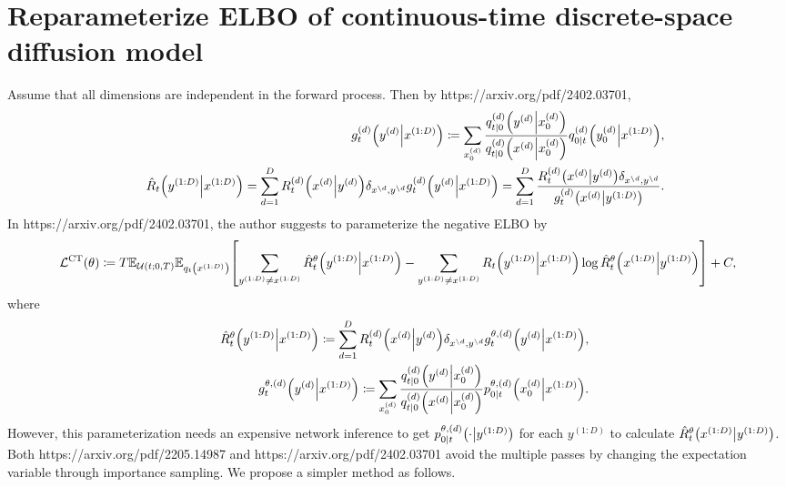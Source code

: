 \documentclass[10pt]{article}
\begin{document}
\section{Reparameterize ELBO of continuous-time discrete-space diffusion model}

Assume that all dimensions are independent in the forward process. Then by https://arxiv.org/pdf/2402.03701,
\begin{eqnarray}\label{EqDivParaHatR}
  &&g^{(d)}_t\qty(y^{(d)}\middle|x^{(1:D)})\coloneq\sum_{x^{(d)}_0}\frac{q^{(d)}_{t|0}\qty(y^{(d)}\middle|x^{(d)}_0)}{q^{(d)}_{t|0}\qty(x^{(d)}\middle|x^{(d)}_0)}q^{(d)}_{0|t}\qty(y^{(d)}_0\middle| x^{(1:D)}),\\
  &&\hat{R}_t\qty(y^{(1:D)}\middle|x^{(1:D)})=\sum_{d=1}^D R^{(d)}_t\qty(x^{(d)}\middle| y^{(d)})\delta_{x^{\setminus d},y^{\setminus d}} g^{(d)}_t\qty(y^{(d)}\middle|x^{(1:D)})=\sum_{d=1}^D \frac{R^{(d)}_t\qty(x^{(d)}\middle| y^{(d)})\delta_{x^{\setminus d},y^{\setminus d}}}{g^{(d)}_t\qty(x^{(d)}\middle|y^{(1:D)})}.
\end{eqnarray}
In https://arxiv.org/pdf/2402.03701, the author suggests to parameterize the negative ELBO by
\begin{eqnarray*}
  \mathcal{L}^\text{CT}(\theta)\coloneq T\mathbb{E}_{\mathcal{U}(t;0,T)}\mathbb{E}_{q_t\qty(x^{(1:D)})}\qty[\sum_{y^{(1:D)}\neq x^{(1:D)}}\hat{R}_t^\theta\qty(y^{(1:D)}\middle|x^{(1:D)}) - \sum_{y^{(1:D)}\neq x^{(1:D)}}R_t\qty(y^{(1:D)}\middle|x^{(1:D)})\log\hat{R}_t^\theta\qty(x^{(1:D)}\middle|y^{(1:D)})] + C,
\end{eqnarray*}
where
\begin{eqnarray*}
  &&\hat{R}^\theta_t\qty(y^{(1:D)}\middle|x^{(1:D)})\coloneqq\sum_{d=1}^D R^{(d)}_t\qty(x^{(d)}\middle| y^{(d)})\delta_{x^{\setminus d},y^{\setminus d}} g^{\theta,(d)}_t\qty(y^{(d)}\middle|x^{(1:D)}),\\
  &&g^{\theta,(d)}_t\qty(y^{(d)}\middle|x^{(1:D)})\coloneq\sum_{x^{(d)}_0}\frac{q^{(d)}_{t|0}\qty(y^{(d)}\middle|x^{(d)}_0)}{q^{(d)}_{t|0}\qty(x^{(d)}\middle|x^{(d)}_0)}p^{\theta,(d)}_{0|t}\qty(x^{(d)}_0\middle| x^{(1:D)}).
\end{eqnarray*}
However, this parameterization needs an expensive network inference to get $p^{\theta,(d)}_{0|t}\qty(\cdot\middle|y^{(1:D)})$ for each $y^{(1:D)}$ to calculate $\hat{R}^\theta_t\qty(x^{(1:D)}\middle|y^{(1:D)})$. Both https://arxiv.org/pdf/2205.14987 and https://arxiv.org/pdf/2402.03701 avoid the multiple passes by changing the expectation variable
through importance sampling. We propose a simpler method as follows.
\end{document}
